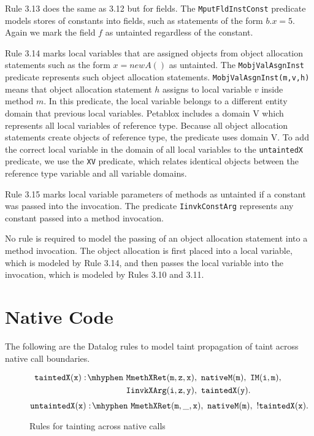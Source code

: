 Rule 3.13 does the same as 3.12 but for fields. The
\texttt{MputFldInstConst} predicate models stores of constants into
fields, such as statements of the form $b.x = 5$. Again we mark the
field $f$ as untainted regardless of the constant.

Rule 3.14 marks local variables that are assigned objects from object
allocation statements such as the form $x = new A()$ as untainted. The
\texttt{MobjValAsgnInst} predicate represents such object allocation
statements. \texttt{MobjValAsgnInst(m,v,h)} means that object
allocation statement $h$ assigns to local variable $v$ inside method
$m$. In this predicate, the local variable belongs to a different
entity domain that previous local variables. Petablox includes a
domain V which represents all local variables of reference
type. Because all object allocation statements create objects of
reference type, the predicate uses domain V. To add the correct local
variable in the domain of all local variables to the
\texttt{untaintedX} predicate, we use the \texttt{XV} predicate, which
relates identical objects between the reference type variable and all
variable domains.

Rule 3.15 marks local variable parameters of methods as untainted if a
constant was passed into the invocation. The predicate
\texttt{IinvkConstArg} represents any constant passed into a method
invocation.

No rule is required to model the passing of an object allocation
statement into a method invocation. The object allocation is first
placed into a local variable, which is modeled by Rule 3.14, and then
passes the local variable into the invocation, which is modeled by
Rules 3.10 and 3.11.
\section{Native Code}
The following are the Datalog rules to model taint propagation of
taint across native call boundaries.
\begin{figure}[H]
\begin{equation}
  \begin{split}
    \mathtt{taintedX(x) \is} & \mathtt{MmethXRet(m,z,x) \also
      nativeM(m) \also IM(i,m) \also} \\ & \mathtt{IinvkXArg(i,z,y)
      \also taintedX(y).} \\
  \end{split}
\end{equation}
\begin{equation}
  \mathtt{untaintedX(x) \is MmethXRet(m,\_,x) \also nativeM(m) \also
    !taintedX(x).}
\end{equation}
\caption{Rules for tainting across native calls}\label{fig:native}
\end{figure}

